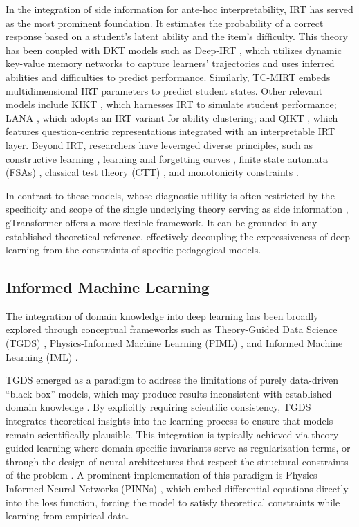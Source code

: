 \documentclass[applsci,article,submit,moreauthors,pdftex]{Definitions/mdpi}
\begin{document}
In the integration of side information for ante-hoc interpretability, IRT \citep{embretson2013item} has served as the most prominent foundation. It estimates the probability of a correct response based on a student’s latent ability and the item's difficulty. This theory has been coupled with DKT models such as Deep-IRT \citep{yeung2019deep}, which utilizes dynamic key-value memory networks to capture learners' trajectories and uses inferred abilities and difficulties to predict performance. Similarly, TC-MIRT \citep{su2021time} embeds multidimensional IRT parameters to predict student states. Other relevant models include KIKT \citep{gan2020knowledge}, which harnesses IRT to simulate student performance; LANA \citep{zhou2021lana}, which adopts an IRT variant for ability clustering; and QIKT \citep{chen2023improving}, which features question-centric representations integrated with an interpretable IRT layer. Beyond IRT, researchers have leveraged diverse principles, such as constructive learning \citep{liu2022ability, sun2024progressive}, learning and forgetting curves \citep{zhang2021learning}, finite state automata (FSAs) \citep{zhu2020learning}, classical test theory (CTT) \citep{lee2024monacobert}, and monotonicity constraints \citep{zhang2023counterfactual}. 

In contrast to these models, whose diagnostic utility is often restricted by the specificity and scope of the single underlying theory serving as side information \citep{bai2024survey}, gTransformer offers a more flexible framework. It can be grounded in any established theoretical reference, effectively decoupling the expressiveness of deep learning from the constraints of specific pedagogical models.

\subsection{Informed Machine Learning} \label{sec_iml}

The integration of domain knowledge into deep learning has been broadly explored through conceptual frameworks such as Theory-Guided Data Science (TGDS) \citep{karpatne2017theory}, Physics-Informed Machine Learning (PIML) \citep{karniadakis2021physics}, and Informed Machine Learning (IML) \citep{vonrueden2021informed}. 

TGDS emerged as a paradigm to address the limitations of purely data-driven ``black-box'' models, which may produce results inconsistent with established domain knowledge \citep{karpatne2017theory}. By explicitly requiring scientific consistency, TGDS integrates theoretical insights into the learning process to ensure that models remain scientifically plausible. This integration is typically achieved via theory-guided learning where domain-specific invariants serve as regularization terms, or through the design of neural architectures that respect the structural constraints of the problem \citep{karpatne2017theory, jia2021physics}. A prominent implementation of this paradigm is Physics-Informed Neural Networks (PINNs) \citep{raissi2019physics, karniadakis2021physics}, which embed differential equations directly into the loss function, forcing the model to satisfy theoretical constraints while learning from empirical data. 
\end{document}
